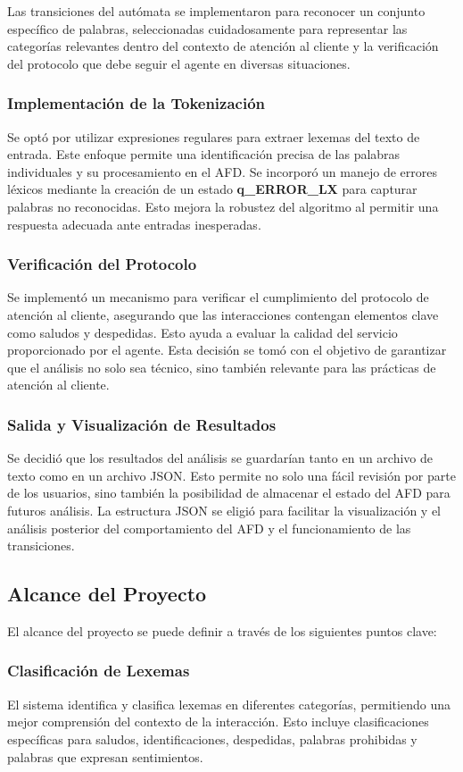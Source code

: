 \documentclass[12pt,a4paper]{article}
\begin{document}
Las transiciones del autómata se implementaron para reconocer un conjunto específico de palabras, seleccionadas cuidadosamente para representar las categorías relevantes dentro del contexto de atención al cliente y la verificación del protocolo que debe seguir el agente en diversas situaciones.
\subsubsection{Implementación de la Tokenización}
Se optó por utilizar expresiones regulares para extraer lexemas del texto de entrada. Este enfoque permite una identificación precisa de las palabras individuales y su procesamiento en el AFD.
Se incorporó un manejo de errores léxicos mediante la creación de un estado \textbf{q\_ERROR\_LX} para capturar palabras no reconocidas. Esto mejora la robustez del algoritmo al permitir una respuesta adecuada ante entradas inesperadas.
\subsubsection{Verificación del Protocolo}
Se implementó un mecanismo para verificar el cumplimiento del protocolo de atención al cliente, asegurando que las interacciones contengan elementos clave como saludos y despedidas. Esto ayuda a evaluar la calidad del servicio proporcionado por el agente.
Esta decisión se tomó con el objetivo de garantizar que el análisis no solo sea técnico, sino también relevante para las prácticas de atención al cliente.
\subsubsection{Salida y Visualización de Resultados}
Se decidió que los resultados del análisis se guardarían tanto en un archivo de texto como en un archivo JSON. Esto permite no solo una fácil revisión por parte de los usuarios, sino también la posibilidad de almacenar el estado del AFD para futuros análisis.
La estructura JSON se eligió para facilitar la visualización y el análisis posterior del comportamiento del AFD y el funcionamiento de las transiciones.

\subsection{Alcance del Proyecto}
El alcance del proyecto se puede definir a través de los siguientes puntos clave:

\subsubsection{Clasificación de Lexemas}
El sistema identifica y clasifica lexemas en diferentes categorías, permitiendo una mejor comprensión del contexto de la interacción. Esto incluye clasificaciones específicas para saludos, identificaciones, despedidas, palabras prohibidas y palabras que expresan sentimientos.
\end{document}
